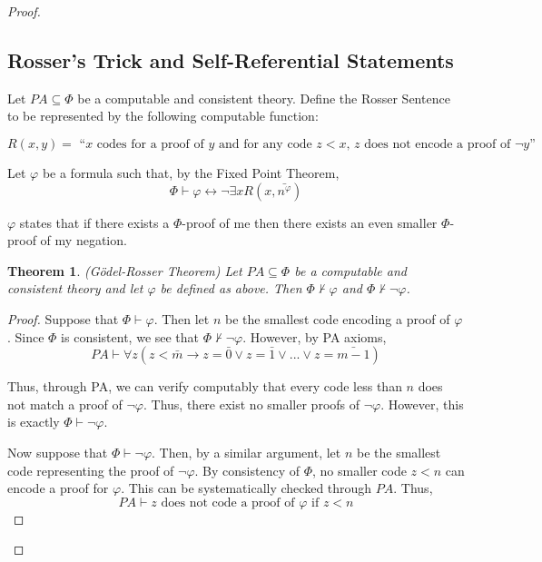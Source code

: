 \documentclass[a4paper,10pt]{article}
\newtheorem{theorem}{Theorem}[section]
\let\phi\varphi
\newcommand*\map{\rightarrow}
\newcommand*\n{\newline\par}
\newcommand*\phibar{\bar{n^{\phi}}}
\newcommand*\prf{\vdash}
\newcommand*\biject{\leftrightarrow}
\newcommand*\np{\neg\phi}
\begin{document}
\begin{proof}
  \subsection{Rosser's Trick and Self-Referential Statements}
  
  Let $PA \subseteq \Phi$ be a computable and consistent theory. Define the Rosser Sentence to be represented by the following computable function:
  
  
  \begin{equation*}
   R(x,y) = \text{ ``$x$ codes for a proof of $y$ and for any code $z < x$, $z$ does not encode a proof of $\neg y$''} 
  \end{equation*}
  
  Let $\phi$ be a formula such that, by the Fixed Point Theorem,
  \begin{equation*}
   \Phi \prf \phi \biject \neg\exists x R(x,\phibar)
  \end{equation*}

  $\phi$ states that if there exists a $\Phi$-proof of me then there exists an even smaller $\Phi$-proof of my negation.
  
  \begin{theorem}
   (G\"{o}del-Rosser Theorem) Let $PA \subseteq \Phi$ be a computable and consistent theory and let $\phi$ be defined as above. Then $\Phi \not\prf \phi$ and $\Phi \not\prf \neg\phi$.
  \end{theorem}
  
  \begin{proof}
   Suppose that $\Phi \prf \phi$. Then let $n$ be the smallest code encoding a proof of $\phi$. Since $\Phi$ is consistent, we see that $\Phi \not\prf \neg\phi$. However, by PA axioms,
   \begin{equation*}
    PA \prf \forall z (z < \bar{m} \map z = \bar{0} \lor z = \bar{1} \lor ... \lor z = \bar{m-1})
   \end{equation*}

   Thus, through PA, we can verify computably that every code less than $n$ does not match a proof of $\neg\phi$. Thus, there exist no smaller proofs of $\neg\phi$. However, this is exactly $\Phi \prf \neg\phi$. \n
   Now suppose that $\Phi \prf \np$. Then, by a similar argument, let $n$ be the smallest code representing the proof of $\np$. By consistency of $\Phi$, no smaller code $z < n$ can encode a proof for $\phi$. This can be systematically checked through $PA$. 
   Thus,
   \begin{equation*}
      PA \prf \text{$z$ does not code a proof of $\phi$ if $z < n$}
   \end{equation*}


\end{proof}
\end{proof}
\end{document}

